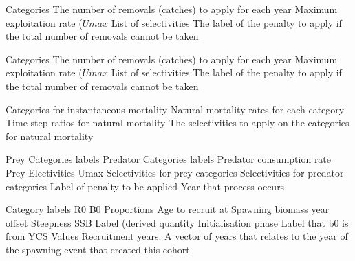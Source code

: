  {Categories}
 {The number of removals (catches) to apply for each year}
 {Maximum exploitation rate ($Umax$}
 {List of selectivities}
 {The label of the penalty to apply if the total number of removals cannot be taken}
\par\textbf{}\par
{} {Categories}
 {The number of removals (catches) to apply for each year}
 {Maximum exploitation rate ($Umax$}
 {List of selectivities}
 {The label of the penalty to apply if the total number of removals cannot be taken}
\par\textbf{}\par
{} {Categories for instantaneous mortality}
 {Natural mortality rates for each category}
 {Time step ratios for natural mortality}
 {The selectivities to apply on the categories for natural mortality}
\par\textbf{}\par
{} {Prey Categories labels}
 {Predator Categories labels}
 {Predator consumption rate}
 {Prey Electivities}
 {Umax}
 {Selectivities for prey categories}
 {Selectivities for predator categories}
 {Label of penalty to be applied}
 {Year that process occurs}
\par\textbf{}\par
\par\textbf{}\par
{} {Category labels}
 {R0}
 {B0}
 {Proportions}
 {Age to recruit at}
 {Spawning biomass year offset}
 {Steepness}
 {SSB Label (derived quantity}
 {Initialisation phase Label that b0 is from}
 {YCS Values}
 {Recruitment years. A vector of years that relates to the year of the spawning event that created this cohort}
